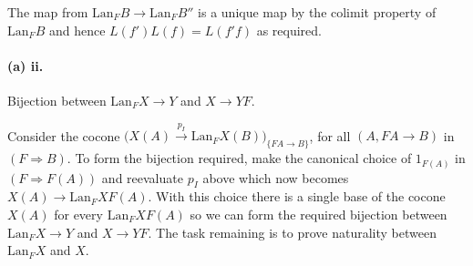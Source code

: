 \documentclass{article}
\begin{document}
The map from $\text{Lan}_FB \rightarrow \text{Lan}_FB''$ is a unique map by the colimit property of $\text{Lan}_FB$ and hence $L(f')L(f) = L(f'f)$ as required.

\paragraph{(a) ii.}
Bijection between $\text{Lan}_FX \rightarrow Y$ and $X \rightarrow Y F$.

Consider the cocone $\big(X(A) \xrightarrow{p_I} \text{Lan}_FX(B)\big)_{\{FA \rightarrow B\}}$, for all $\left(A,FA \rightarrow B\right)$ in $\left(F \Rightarrow B\right)$. To form the bijection required, make the canonical choice of $1_{F(A)}$ in $(F \Rightarrow F(A))$ and reevaluate $p_I$ above which now becomes $X(A) \rightarrow \text{Lan}_FXF(A)$. With this choice there is a single base of the cocone $X(A)$ for every $\text{Lan}_FXF(A)$ so we can form the required bijection between $\text{Lan}_FX \rightarrow Y$ and $X \rightarrow Y F$. The task remaining is to prove naturality between $\text{Lan}_FX$ and $X$.
\end{document}
